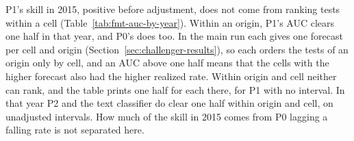P1's skill in 2015, positive before adjustment, does not come from ranking tests within a cell (Table~\ref{tab:fmt-auc-by-year}). Within an origin, P1's AUC clears one half in that year, and P0's does too. In the main run each gives one forecast per cell and origin (Section~\ref{sec:challenger-results}), so each orders the tests of an origin only by cell, and an AUC above one half means that the cells with the higher forecast also had the higher realized rate. Within origin and cell neither can rank, and the table prints one half for each there, for P1 with no interval. In that year P2 and the text classifier do clear one half within origin and cell, on unadjusted intervals. How much of the skill in 2015 comes from P0 lagging a falling rate is not separated here.

\begin{table}[t]\centering\scriptsize
\caption{The event AUC grouped by calendar year on the headline archive, within origin (where P0 still varies across cells) and within origin and cell (where P0 is a single number, and in the main run P1 is too, so the table prints one half for P1 there, with no interval).}
\label{tab:fmt-auc-by-year}
\resizebox{\columnwidth}{!}{}
\end{table}

